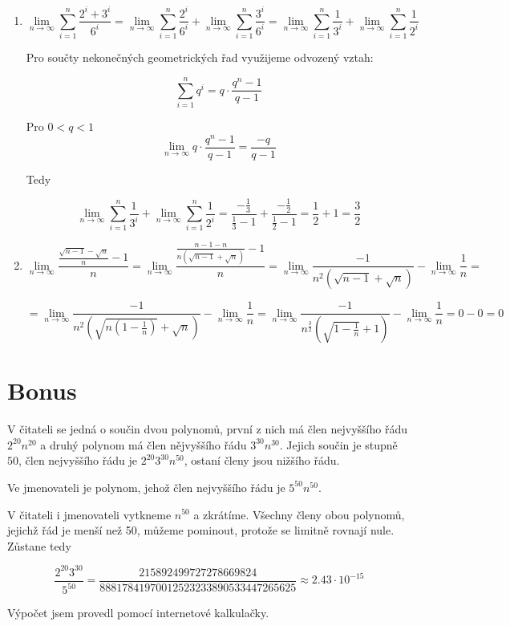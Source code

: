 \documentclass[10pt,a4paper]{article}
\theoremstyle{plain}
\theoremstyle{definition}
\begin{document}
\begin{enumerate}[label=(\alph*)]
\item \begin{equation*}
\lim_{n \to \infty} \sum^n_{i=1} \frac{2^i + 3^i}{6^i} = \lim_{n \to \infty} \sum^n_{i=1} \frac{2^i}{6^i} +  \lim_{n \to \infty}\sum^n_{i=1} \frac{3^i}{6^i} = \lim_{n \to \infty} \sum^n_{i=1} \frac{1}{3^i} +  \lim_{n \to \infty}\sum^n_{i=1} \frac{1}{2^i}
\end{equation*}

Pro součty nekonečných geometrických řad využijeme odvozený vztah:

\[ \sum^n_{i=1} q^i = q \cdot \frac{q^n-1}{q - 1} \]

Pro $0 < q < 1$
\[ \lim_{n \to \infty} q \cdot \frac{q^n-1}{q - 1} = \frac{-q}{q-1}\]

Tedy

\begin{equation*}
\lim_{n \to \infty} \sum^n_{i=1} \frac{1}{3^i} +  \lim_{n \to \infty}\sum^n_{i=1} \frac{1}{2^i} = \frac{-\frac{1}{3}}{\frac{1}{3} - 1} +  \frac{-\frac{1}{2}}{\frac{1}{2} - 1} = \frac{1}{2} + 1 = \frac32
\end{equation*}

\item 
\[ \lim_{n \to \infty} \frac{\frac{\sqrt{n-1} - \sqrt{n}}{n}-1}{n} =
 \lim_{n \to \infty} \frac{\frac{n-1 - n}{n (\sqrt{n-1} + \sqrt{n})}-1}{n} = \lim_{n \to \infty} {\frac{-1}{n^2 (\sqrt{n-1} + \sqrt{n})}} - \lim_{n \to \infty} \frac1n  = \] 
 
 \[
= \lim_{n \to \infty} {\frac{-1}{n^2 (\sqrt{n(1-\frac1n)} + \sqrt{n})}} - \lim_{n \to \infty} \frac1n =\lim_{n \to \infty}  {\frac{-1}{n^{\frac32} (\sqrt{1-\frac1n} + 1)}} - \lim_{n \to \infty} \frac1n = 0 - 0 = 0 \]

\end{enumerate}

\section{Bonus}
V čitateli se jedná o součin dvou polynomů, první z nich má člen nejvyššího řádu $2^{20}n^{20}$ a druhý polynom má člen nějvyššího řádu $3^{30}n^{30}$. Jejich součin je stupně $50$, člen nejvyššího řádu je  $2^{20}3^{30}n^{50}$, ostaní členy jsou nižšího řádu.

\hfill

Ve jmenovateli je polynom, jehož člen nejvyššího řádu je $5^{50}n^{50}$.

\hfill

V čitateli i jmenovateli vytkneme $n^{50}$ a zkrátíme. Všechny členy obou polynomů, jejichž řád je menší než 50, můžeme pominout, protože se limitně rovnají nule. Zůstane tedy

\[\frac{2^{20}3^{30}}{5^{50}} = \frac{215892499727278669824}{88817841970012523233890533447265625} \approx 2.43 \cdot 10^{-15} \]

Výpočet jsem provedl pomocí internetové kalkulačky.
\end{document}
